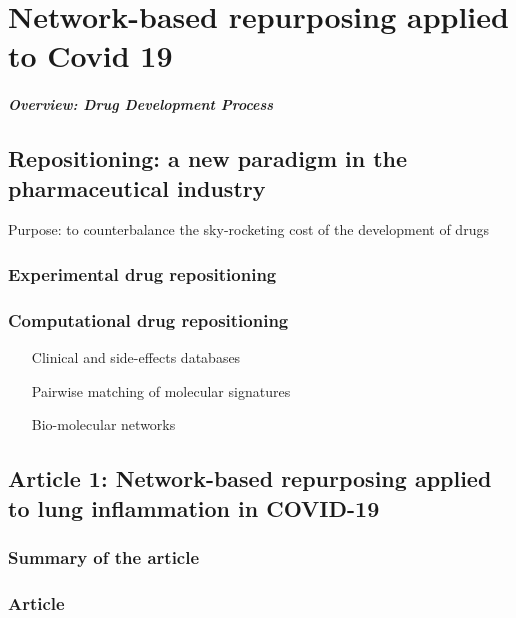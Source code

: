 \chapter{Network-based repurposing applied to Covid 19}

\paragraph{Overview: Drug Development Process}

\section{Repositioning: a new paradigm in the pharmaceutical industry}

Purpose: to counterbalance the sky-rocketing cost of the development of drugs


\subsection{Experimental drug repositioning}

\subsection{Computational drug repositioning}

\begin{enumerate}[label=(\Alph*)]
\item[Clinical and side-effects databases]

\item[Pairwise matching of molecular signatures]

\item[Bio-molecular networks]
\end{enumerate}

\section{Article 1: Network-based repurposing applied to lung inflammation in COVID-19}
\label{sec:covid19-repurposing}
\subsection{Summary of the article}
\subsection{Article}